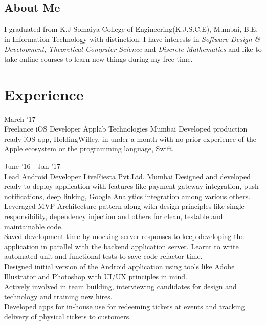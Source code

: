 \documentclass[10pt, a4paper, sans]{moderncv}
\title{}
\begin{document}
\makecvtitle

\subsection{\hfil About Me \hfil}
I graduated from K.J Somaiya College of Engineering(K.J.S.C.E), Mumbai, B.E. in Information Technology with distinction. I have interests in \emph{Software Design \& Development}, \emph{Theoretical Computer Science} and \emph{Discrete Mathematics} and like to take online courses to learn new things during my free time. %

\section{Experience}
\cventry
{March '17 \\ {\faApple}}
{Freelance iOS Developer}
{Applab Technologies}
{Mumbai}
{}
{
{\faCaretRight} Developed production ready iOS app, HoldingWilley, in under a month with no prior experience of the Apple ecosystem or the programming language, Swift.
}

\cventry
{June '16 - Jan '17 \\ {\faAndroid} {\faUsers}}
{Lead Android Developer}
{LiveFiesta Pvt.Ltd.}
{Mumbai}
{}
{
{\faCaretRight} Designed and developed ready to deploy application with features like payment gateway integration, push notifications, deep linking, Google Analytics integration among various others. \\
{\faCaretRight} Leveraged MVP Architecture pattern along with design principles like single responsibility, dependency injection and others for clean, testable and maintainable code. \\
{\faCaretRight} Saved development time by mocking server responses to keep developing the application in parallel with the backend application server. Learnt to write automated unit and functional tests to save code refactor time. \\
{\faCaretRight} Designed initial version of the Android application using tools like Adobe Illustrator and Photoshop with UI/UX principles in mind. \\
{\faCaretRight} Actively involved in team building, interviewing candidates for design and technology and training new hires.\\
{\faCaretRight} Developed apps for in-house use for redeeming tickets at events and tracking delivery of physical tickets to customers.
}
\end{document}
